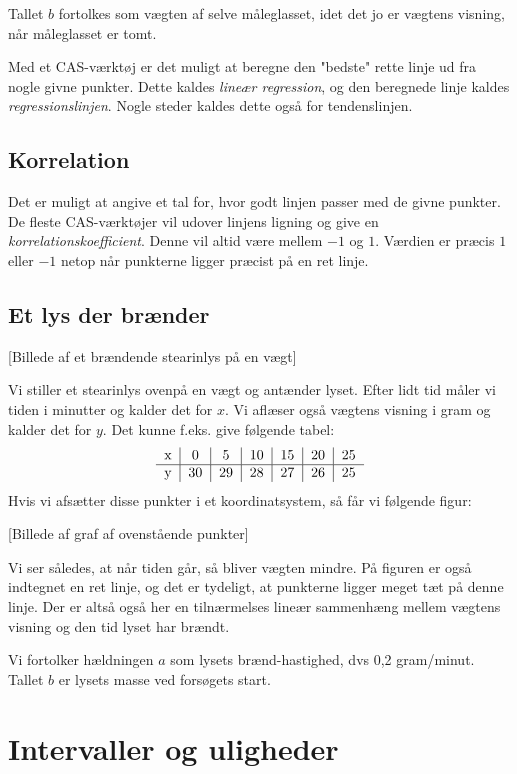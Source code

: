 \documentclass[12pt,oneside,a4paper]{article}
\begin{document}
Tallet $b$ fortolkes som vægten af selve måleglasset, idet det jo er vægtens
visning, når måleglasset er tomt.

Med et CAS-værktøj er det muligt at beregne den "bedste" rette linje ud fra
nogle givne punkter. Dette kaldes {\em lineær regression}, og den beregnede
linje kaldes {\em regressionslinjen}. Nogle steder kaldes dette også for
tendenslinjen.

\subsection{Korrelation}
Det er muligt at angive et tal for, hvor godt linjen passer med de givne
punkter.  De fleste CAS-værktøjer vil udover linjens ligning og give en {\em
korrelationskoefficient}.  Denne vil altid være mellem $-1$ og $1$. Værdien er
præcis $1$ eller $-1$ netop når punkterne ligger præcist på en ret linje.


\subsection{Et lys der brænder}
[Billede af et brændende stearinlys på en vægt]

Vi stiller et stearinlys ovenpå en vægt og antænder lyset. Efter lidt tid måler
vi tiden i minutter og kalder det for $x$. Vi aflæser også vægtens visning i
gram og kalder det for $y$. Det kunne f.eks. give følgende tabel:
$$
\begin{tabular}{c|c|c|c|c|c|c}
    x &  0 &  5 & 10 & 15 & 20 & 25 \\
    \hline
    y & 30 & 29 & 28 & 27 & 26 & 25
\end{tabular}
$$
Hvis vi afsætter disse punkter i et koordinatsystem, så får vi følgende figur:

[Billede af graf af ovenstående punkter]

Vi ser således, at når tiden går, så bliver vægten mindre.
På figuren er også indtegnet en ret linje, og det er tydeligt, at punkterne
ligger meget tæt på denne linje.  Der er altså også her en tilnærmelses lineær
sammenhæng mellem vægtens visning og den tid lyset har brændt.

Vi fortolker hældningen $a$ som lysets brænd-hastighed, dvs 0,2 gram/minut.
Tallet $b$ er lysets masse ved forsøgets start.

\section{Intervaller og uligheder}
\end{document}
